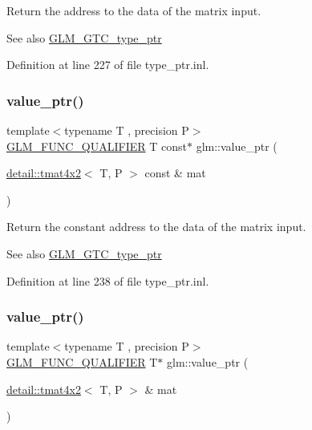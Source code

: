 Return the address to the data of the matrix input. \begin{DoxySeeAlso}{See also}
\hyperlink{group__gtc__type__ptr}{G\+L\+M\+\_\+\+G\+T\+C\+\_\+type\+\_\+ptr} 
\end{DoxySeeAlso}


Definition at line 227 of file type\+\_\+ptr.\+inl.

\mbox{\label{group__gtc__type__ptr_ga73acc0dbfeeb9e6c09df1f79fd990b84}} 
\subsubsection{\texorpdfstring{value\+\_\+ptr()}{value\_ptr()}\hspace{0.1cm}{\footnotesize\ttfamily [20/27]}}
{\footnotesize\ttfamily template$<$typename T , precision P$>$ \\
\hyperlink{setup_8hpp_a33fdea6f91c5f834105f7415e2a64407}{G\+L\+M\+\_\+\+F\+U\+N\+C\+\_\+\+Q\+U\+A\+L\+I\+F\+I\+ER} T const$\ast$ glm\+::value\+\_\+ptr (\begin{DoxyParamCaption}\item[{\hyperlink{structglm_1_1detail_1_1tmat4x2}{detail\+::tmat4x2}$<$ T, P $>$ const \&}]{mat }\end{DoxyParamCaption})}

Return the constant address to the data of the matrix input. \begin{DoxySeeAlso}{See also}
\hyperlink{group__gtc__type__ptr}{G\+L\+M\+\_\+\+G\+T\+C\+\_\+type\+\_\+ptr} 
\end{DoxySeeAlso}


Definition at line 238 of file type\+\_\+ptr.\+inl.

\mbox{\label{group__gtc__type__ptr_ga478c7dc470b36836ac5392e852fd2348}} 
\subsubsection{\texorpdfstring{value\+\_\+ptr()}{value\_ptr()}\hspace{0.1cm}{\footnotesize\ttfamily [21/27]}}
{\footnotesize\ttfamily template$<$typename T , precision P$>$ \\
\hyperlink{setup_8hpp_a33fdea6f91c5f834105f7415e2a64407}{G\+L\+M\+\_\+\+F\+U\+N\+C\+\_\+\+Q\+U\+A\+L\+I\+F\+I\+ER} T$\ast$ glm\+::value\+\_\+ptr (\begin{DoxyParamCaption}\item[{\hyperlink{structglm_1_1detail_1_1tmat4x2}{detail\+::tmat4x2}$<$ T, P $>$ \&}]{mat }\end{DoxyParamCaption})}

